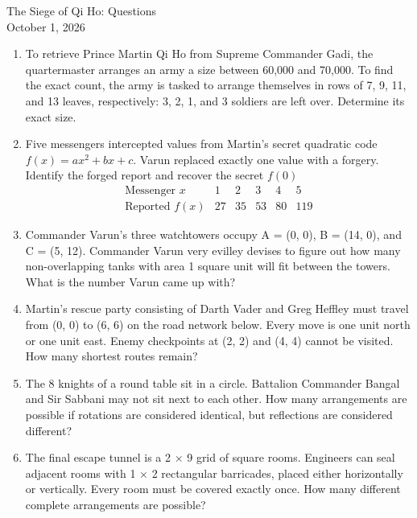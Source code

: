 \documentclass[11pt]{article}
\begin{document}
\begin{center}
  {\Large The Siege of Qi Ho: Questions}\\[3pt]
  October 1, 2026
\end{center}

\begin{enumerate}[itemsep=1.5em]
\item To retrieve Prince Martin Qi Ho from Supreme Commander Gadi, the quartermaster arranges an army a size between 60,000 and 70,000. To find the exact count, the army is tasked to arrange themselves in rows of 7, 9, 11, and 13 leaves, respectively: 3, 2, 1, and 3 soldiers are left over. Determine its exact size.

\item Five messengers intercepted values from Martin's secret quadratic code $f(x)=ax^2+bx+c$. Varun replaced exactly one value with a forgery. Identify the forged report and recover the secret $f(0)$
\[
\begin{array}{c|ccccc}
\text{Messenger }x&1&2&3&4&5\\ \hline
\text{Reported }f(x)&27&35&53&80&119
\end{array}
\]

\item Commander Varun's three watchtowers occupy A = (0, 0), B = (14, 0), and C = (5, 12). Commander Varun very evilley devises to figure out how many non-overlapping tanks with area 1 square unit will fit between the towers. What is the number Varun came up with?

\item Martin's rescue party consisting of Darth Vader and Greg Heffley must travel from (0, 0) to (6, 6) on the road network below. Every move is one unit north or one unit east. Enemy checkpoints at (2, 2) and (4, 4) cannot be visited. How many shortest routes remain?

\item The 8 knights of a round table sit in a circle. Battalion Commander Bangal and Sir Sabbani may not sit next to each other. How many arrangements are possible if rotations are considered identical, but reflections are considered different?

\item The final escape tunnel is a 2 $\times$ 9 grid of square rooms. Engineers can seal adjacent rooms with 1 $\times$ 2 rectangular barricades, placed either horizontally or vertically. Every room must be covered exactly once. How many different complete arrangements are possible?


\end{enumerate}
\end{document}
